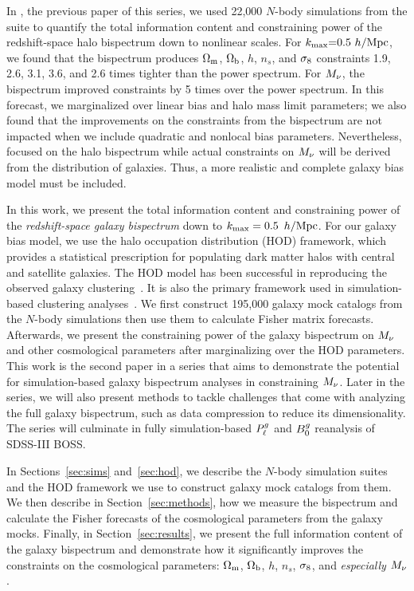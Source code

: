 In \cite{hahn2020}, the previous paper of this series, we used 22,000 $N$-body
simulations from the \quij suite to quantify the total information content and
constraining power of the redshift-space halo bispectrum down to nonlinear scales. 
For $k_{\rm max}{=}0.5~h/{\rm Mpc}$, we found that the bispectrum produces $\Omega_{\rm m}$,
$\Omega_{\rm b}$, $h$, $n_s$, and $\sigma_8$ constraints 1.9, 2.6, 3.1, 3.6, and 2.6 times
tighter than the power spectrum. For $M_\nu$, the bispectrum improved 
constraints by 5 times over the power spectrum. In this forecast, we marginalized 
over linear bias and halo mass limit parameters; we also found that the
improvements on the constraints from the bispectrum are not impacted when we
include quadratic and nonlocal bias parameters. Nevertheless, \cite{hahn2020}
focused on the halo bispectrum while actual constraints on $M_\nu$ will be 
derived from the distribution of galaxies. Thus, a more realistic and complete 
galaxy bias model must be included.

In this work, we present the total information content and constraining power
of the {\em redshift-space galaxy bispectrum} down to $k_{\rm max}= 0.5~\,h/\mathrm{Mpc}$. For our galaxy
bias model, we use the halo occupation distribution (HOD) framework, which provides a
statistical prescription for populating dark matter halos with central and satellite
galaxies. The HOD model has been successful in reproducing the observed galaxy
clustering~\citep[\emph{e.g.}][]{zheng2005, leauthaud2012, tinker2013, zentner2016, vakili2019}. 
It is also the primary framework used in simulation-based clustering
analyses~\citep[\eg][]{mcclintock2018, zhai2019, lange2019, wibking2019}. 
We first construct 195,000 galaxy mock catalogs from the \quij $N$-body
simulations then use them to calculate Fisher matrix forecasts. Afterwards, we
present the constraining power of the galaxy bispectrum on $M_\nu$ and other 
cosmological parameters after marginalizing over the HOD parameters. This work
is the second paper in a series that aims to demonstrate the potential for
simulation-based galaxy bispectrum analyses in constraining $M_\nu$. Later in
the series, we will also present methods to tackle challenges that come with
analyzing the full galaxy bispectrum, such as data compression to reduce its
dimensionality. The series will culminate in fully simulation-based $P^g_{\ell}$ and
$B^g_0$ reanalysis of SDSS-III BOSS. 

In Sections~\ref{sec:sims} and~\ref{sec:hod}, we describe the \quij $N$-body simulation 
suites and the HOD framework we use to construct galaxy mock catalogs from them. We then 
describe in Section~\ref{sec:methods}, how we measure the bispectrum and
calculate the Fisher forecasts of the cosmological parameters from the galaxy
mocks. Finally, in Section~\ref{sec:results}, we present the full information
content of the galaxy bispectrum and demonstrate how it significantly improves
the constraints on the cosmological parameters: $\Omega_{\rm m}$, $\Omega_{\rm b}$, $h$, $n_s$,
$\sigma_8$, and {\em especially} $M_\nu$. 
